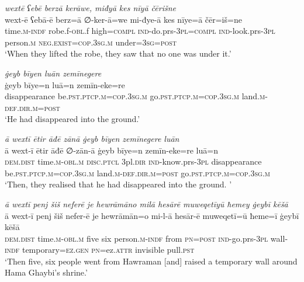 \ea \label{BP.194}
\textit{wextē ʕebē berzā kerāwe, miđyā kes nīyā čērišne} \\ 
\gll wext-ē ʕebā-ē berz=ā ∅-ker-ā=we mi-đye-ā kes nīye=ā čēr=iš=ne \\ 
 time\textsc{.m}\textsc{-indf} robe.f\textsc{-obl}.f high\textsc{=compl} \textsc{ind-}do.prs\textsc{-3pl}\textsc{=compl} \textsc{ind-}look.prs\textsc{-3pl} person\textsc{.m} \textsc{\textsc{neg.}exist}\textsc{=cop}\textsc{.3sg}\textsc{.m} under\textsc{=3sg}\textsc{=\textsc{post}} \\ 
\glt `When they lifted the robe, they saw that no one was under it.'
\z 
 
\ea \label{BP.196}
\textit{ġeyb bīyen luān zemīnegere} \\ 
\gll ġeyb bīye=n luā=n zemīn-eke=re \\ 
 disappearance be\textsc{.pst}\textsc{.ptcp}\textsc{.m}\textsc{=cop}\textsc{.3sg}\textsc{.m} go\textsc{.pst}\textsc{.ptcp}\textsc{.m}\textsc{=cop}\textsc{.3sg}\textsc{.m} land\textsc{.m}\textsc{-def}\textsc{.dir}\textsc{.m}\textsc{=\textsc{post}} \\ 
\glt `He had disappeared into the ground.'
\z 
 
\ea \label{BP.197}
\textit{ā wextī ētir āđē zānā ġeyb bīyen zemīnegere luān} \\ 
\gll ā wext-ī ētir āđē ∅-zān-ā ġeyb bīye=n zemīn-eke=re luā=n \\ 
 \textsc{dem.dist} time\textsc{.m}\textsc{-obl}\textsc{.m} \textsc{disc.ptcl} 3pl\textsc{.dir} \textsc{ind-}know.prs\textsc{-3pl} disappearance be\textsc{.pst}\textsc{.ptcp}\textsc{.m}\textsc{=cop}\textsc{.3sg}\textsc{.m} land\textsc{.m}\textsc{-def}\textsc{.dir}\textsc{.m}\textsc{=\textsc{post}} go\textsc{.pst}\textsc{.ptcp}\textsc{.m}\textsc{=cop}\textsc{.3sg}\textsc{.m} \\ 
\glt `Then, they realised that he had disappeared into the ground. '
\z 
 
\ea \label{BP.203}
\textit{ā wextī penj šiš neferē je hewrāmāno milā hesārē muweqetīyū ħemey ġeybī kēšā} \\ 
\gll ā wext-ī penj šiš nefer-ē je hewrāmān=o mi-l-ā hesār-ē muweqetī=ū ħeme=ī ġeybī kēšā \\ 
 \textsc{dem.dist} time\textsc{.m}\textsc{-obl}\textsc{.m} five six person\textsc{.m}\textsc{-indf} from \textsc{pn}\textsc{=\textsc{post}} \textsc{ind-}go.prs\textsc{-3pl} wall\textsc{-indf} temporary\textsc{=ez.gen} \textsc{pn}=ez.\textsc{attr} invisible pull\textsc{.pst} \\ 
\glt `Then five, six people went from Hawraman [and] raised a temporary wall around Hama Ghaybi’s shrine.'
\z 
 
